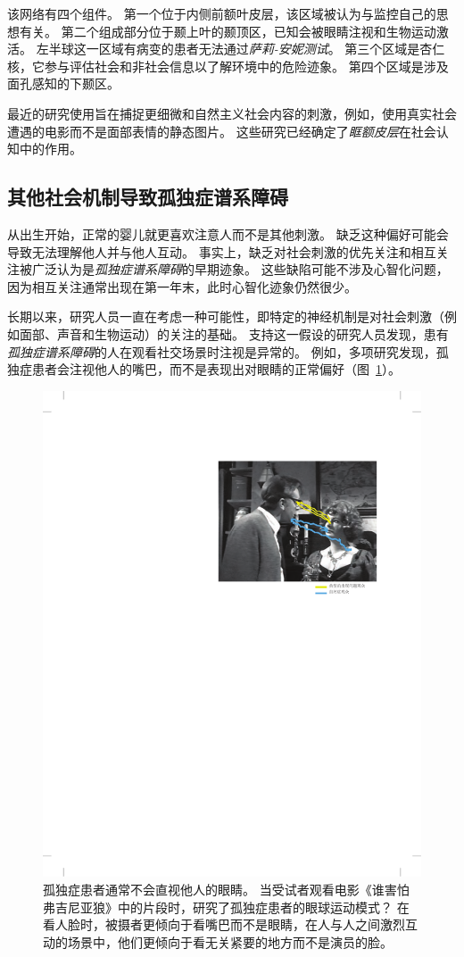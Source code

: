 该网络有四个组件。
第一个位于内侧前额叶皮层，该区域被认为与监控自己的思想有关。
第二个组成部分位于颞上叶的颞顶区，已知会被眼睛注视和生物运动激活。
左半球这一区域有病变的患者无法通过\textit{萨莉-安妮测试}。
第三个区域是杏仁核，它参与评估社会和非社会信息以了解环境中的危险迹象。
第四个区域是涉及面孔感知的下颞区。


最近的研究使用旨在捕捉更细微和自然主义社会内容的刺激，例如，使用真实社会遭遇的电影而不是面部表情的静态图片。
这些研究已经确定了\textit{眶额皮层}在社会认知中的作用。



\subsection{其他社会机制导致孤独症谱系障碍}

从出生开始，正常的婴儿就更喜欢注意人而不是其他刺激。
缺乏这种偏好可能会导致无法理解他人并与他人互动。
事实上，缺乏对社会刺激的优先关注和相互关注被广泛认为是\textit{孤独症谱系障碍}的早期迹象。
这些缺陷可能不涉及心智化问题，因为相互关注通常出现在第一年末，此时心智化迹象仍然很少。


长期以来，研究人员一直在考虑一种可能性，即特定的神经机制是对社会刺激（例如面部、声音和生物运动）的关注的基础。
支持这一假设的研究人员发现，患有\textit{孤独症谱系障碍}的人在观看社交场景时注视是异常的。
例如，多项研究发现，孤独症患者会注视他人的嘴巴，而不是表现出对眼睛的正常偏好（图~\ref{fig:62_5}）。


\begin{figure}[htbp]
	\centering
	\includegraphics[width=0.75\linewidth]{chap62/fig_62_5}
	\caption{孤独症患者通常不会直视他人的眼睛。
		当受试者观看电影《谁害怕弗吉尼亚狼》中的片段时，研究了孤独症患者的眼球运动模式？
		在看人脸时，被摄者更倾向于看嘴巴而不是眼睛，在人与人之间激烈互动的场景中，他们更倾向于看无关紧要的地方而不是演员的脸\cite{klin2002defining}。}
	\label{fig:62_5}
\end{figure}



